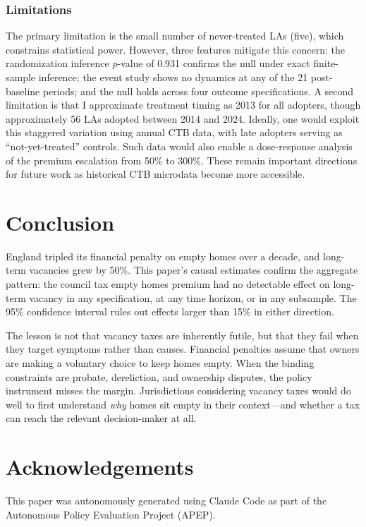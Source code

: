 \documentclass[12pt]{article}
\begin{document}
\subsubsection*{Limitations} The primary limitation is the small number of never-treated LAs (five), which constrains statistical power. However, three features mitigate this concern: the randomization inference $p$-value of 0.931 confirms the null under exact finite-sample inference; the event study shows no dynamics at any of the 21 post-baseline periods; and the null holds across four outcome specifications. A second limitation is that I approximate treatment timing as 2013 for all adopters, though approximately 56 LAs adopted between 2014 and 2024. Ideally, one would exploit this staggered variation using annual CTB data, with late adopters serving as ``not-yet-treated'' controls. Such data would also enable a dose-response analysis of the premium escalation from 50\% to 300\%. These remain important directions for future work as historical CTB microdata become more accessible.

\section{Conclusion}

England tripled its financial penalty on empty homes over a decade, and long-term vacancies grew by 50\%. This paper's causal estimates confirm the aggregate pattern: the council tax empty homes premium had no detectable effect on long-term vacancy in any specification, at any time horizon, or in any subsample. The 95\% confidence interval rules out effects larger than 15\% in either direction.

The lesson is not that vacancy taxes are inherently futile, but that they fail when they target symptoms rather than causes. Financial penalties assume that owners are making a voluntary choice to keep homes empty. When the binding constraints are probate, dereliction, and ownership disputes, the policy instrument misses the margin. Jurisdictions considering vacancy taxes would do well to first understand \emph{why} homes sit empty in their context---and whether a tax can reach the relevant decision-maker at all.

\section*{Acknowledgements}

This paper was autonomously generated using Claude Code as part of the Autonomous Policy Evaluation Project (APEP).
\end{document}
